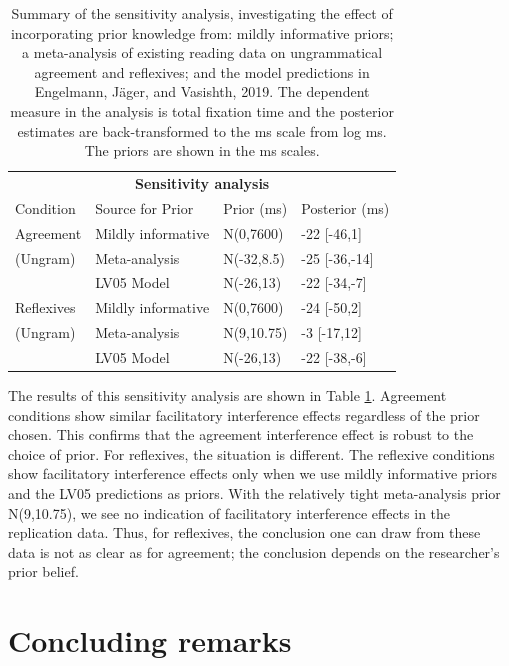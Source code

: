 \documentclass{cambridge7A}\usepackage[]{graphicx}\usepackage[]{color}
\begin{document}
\begin{table}[!htbp]
\begin{center}
\begin{tabular}{llll}
\multicolumn{4}{c}{\textbf{Sensitivity analysis}}\\
Condition & Source for Prior & Prior (ms) & Posterior (ms) \\
\hline
Agreement  & Mildly informative & N(0,7600) & -22 [-46,1]\\
(Ungram) & Meta-analysis  & N(-32,8.5) & -25 [-36,-14]\\
  & LV05 Model   &  N(-26,13) & -22 [-34,-7]\\
\hline                            
Reflexives  & Mildly informative & N(0,7600) & -24 [-50,2] \\
(Ungram) & Meta-analysis & N(9,10.75) & -3 [-17,12]\\ 
  & LV05 Model & N(-26,13) &  -22 [-38,-6]\\
 \hline                            
 \end{tabular}
\end{center}
\caption{Summary of the sensitivity analysis, investigating the effect of incorporating prior knowledge from: mildly informative priors; a meta-analysis of existing reading data on ungrammatical agreement and reflexives; and  the model predictions in Engelmann, J\"ager, and Vasishth, 2019. The dependent measure in the analysis is total fixation time and the posterior estimates are back-transformed to the ms scale from log ms. The priors are shown in the ms scales.}\label{tab:sensitivityanalysis}
\end{table}%

The results of this sensitivity analysis are shown in Table \ref{tab:sensitivityanalysis}.  Agreement conditions show similar facilitatory interference effects regardless of the prior chosen. 
This confirms that the agreement interference effect is robust to the choice of prior. For reflexives, the situation is different. 
The reflexive conditions show  facilitatory interference effects only when we use mildly informative priors and the LV05 predictions as priors.  With the relatively tight meta-analysis prior N(9,10.75), we see no indication of facilitatory interference effects in the replication data. 
Thus, for reflexives, the conclusion one can draw from these data is not as clear as for agreement; the conclusion  depends on the researcher's prior belief.  

\section{Concluding remarks}
\end{document}
